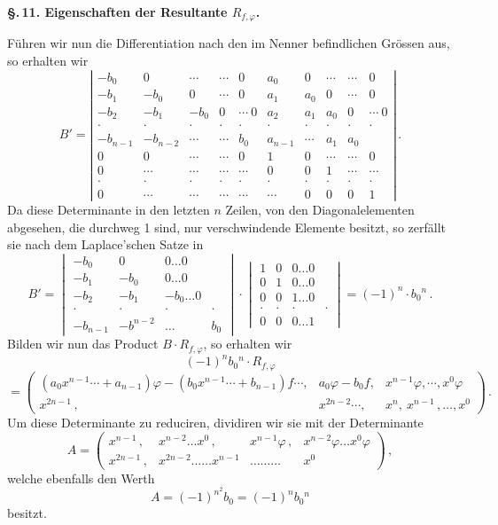 \textbf{\S.\,11. Eigenschaften der Resultante $R_{f,\varphi}$.}

Führen wir nun die Differentiation nach den im Nenner befindlichen Grössen aus, so erhalten wir
\[
B' = \left|\begin{array}{ccccc|ccccc}
-b_0 & 0 & \cdots & \cdots & 0 & a_0 & 0 & \cdots & \cdots & 0\\
-b_1 & -b_0 & 0 & \cdots & 0 & a_1 & a_0 & 0 & \cdots & 0\\
-b_2 & -b_1 & -b_0 & 0 & \cdots\ 0 & a_2 & a_1 & a_0 & 0 & \cdots\ 0\\
\cdot & \cdot & \cdot & \cdot & \cdot & \cdot & \cdot & \cdot & \cdot & \cdot\\
-b_{n-1} & -b_{n-2} & \cdots & \cdots & b_0 & a_{n-1} & \cdots & a_1 & a_0 & \\
0 & 0 & \cdots & \cdots & 0 & 1 & 0 & \cdots & \cdots & 0\\
0 & \cdots & \cdots & \cdots & \cdots & 0 & 0 & 1 & \cdots & \cdots\\
\cdot & \cdot & \cdot & \cdot & \cdot & \cdot & \cdot & \cdot & \cdot & \cdot\\
0 & \cdots & \cdots & \cdots & \cdots & \cdots & 0 & 0 & 0 & 1
\end{array}\right|\,.
\]
Da diese Determinante in den letzten $n$ Zeilen, von den Diagonalelementen abgesehen, die durchweg 1 sind, nur verschwindende Elemente besitzt, so zerfällt sie nach dem Laplace'schen Satze in
\[
B' = \begin{vmatrix} -b_0 & 0 & 0\ldots 0\\ -b_1 & -b_0 & 0\ldots 0\\ -b_2 & -b_1 & -b_0\ldots 0\\ \cdot&\cdot&\cdot&\cdot\\ -b_{n-1}&-b^{n-2}&\ldots& b_0 \end{vmatrix}
\cdot
\begin{vmatrix} 1&0&0\ldots 0\\ 0&1&0\ldots 0\\ 0&0&1\ldots 0\\ \cdot&\cdot&\cdot&\cdot\\ 0&0&0\ldots 1 \end{vmatrix}
= (-1)^n\cdot b_0{}^n\,.
\]
Bilden wir nun das Product $B\cdot R_{f,\varphi}$, so erhalten wir
\[ (-1)^nb_0{}^n\cdot R_{f,\varphi} \]
\[ = \begin{pmatrix} (a_0x^{n-1}\cdots+a_{n-1})\varphi-(b_0x^{n-1}\cdots+b_{n-1})f\cdots, & a_0\varphi-b_0f, & x^{n-1}\varphi,\cdots,x^0\varphi\\ x^{2n-1}\,, & x^{2n-2}\cdots, & x^n,\ x^{n-1}\,,\ldots,x^0 \end{pmatrix}\,. \]
Um diese Determinante zu reduciren, dividiren wir sie mit der Determinante
\[ A = \begin{pmatrix} x^{n-1}\,, & x^{n-2}\ldots x^0\,, & x^{n-1}\varphi\,, & x^{n-2}\varphi\ldots x^0\varphi\\ x^{2n-1}\,, & x^{2n-2}\ldots\ldots x^{n-1} & \ldots\ldots\ldots & x^0 \end{pmatrix}\,, \]
welche ebenfalls den Werth
\[ A = (-1)^{n^2}b_0 = (-1)^nb_0{}^n \]
besitzt.

